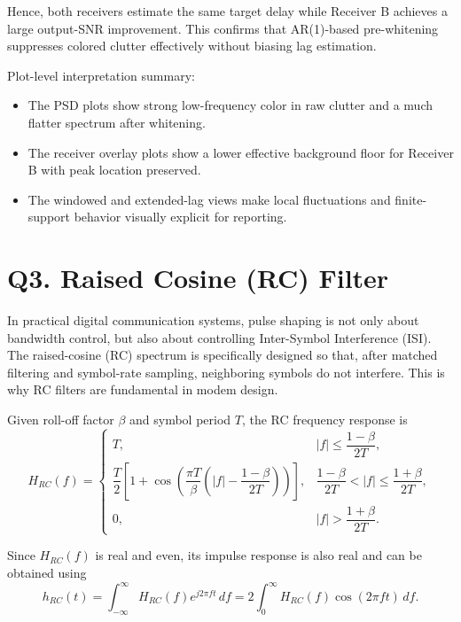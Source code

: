 \documentclass{article}
\begin{document}
Hence, both receivers estimate the same target delay while Receiver B achieves a large output-SNR improvement. This confirms that AR(1)-based pre-whitening suppresses colored clutter effectively without biasing lag estimation.

Plot-level interpretation summary:
\begin{itemize}
\item[$\rightarrow$] The PSD plots show strong low-frequency color in raw clutter and a much flatter spectrum after whitening.
\item[$\rightarrow$] The receiver overlay plots show a lower effective background floor for Receiver B with peak location preserved.
\item[$\rightarrow$] The windowed and extended-lag views make local fluctuations and finite-support behavior visually explicit for reporting.
\end{itemize}

\section{Q3. Raised Cosine (RC) Filter}

In practical digital communication systems, pulse shaping is not only about bandwidth control, but also about controlling Inter-Symbol Interference (ISI). The raised-cosine (RC) spectrum is specifically designed so that, after matched filtering and symbol-rate sampling, neighboring symbols do not interfere. This is why RC filters are fundamental in modem design.

Given roll-off factor $\beta$ and symbol period $T$, the RC frequency response is
\begin{equation*}
H_{RC}(f)=
\begin{cases}
T, & |f|\le\dfrac{1-\beta}{2T},\\[4pt]
\dfrac{T}{2}\left[1+\cos\left(\dfrac{\pi T}{\beta}\left(|f|-\dfrac{1-\beta}{2T}\right)\right)\right], & \dfrac{1-\beta}{2T}<|f|\le\dfrac{1+\beta}{2T},\\[6pt]
0, & |f|>\dfrac{1+\beta}{2T}.
\end{cases}
\end{equation*}

Since $H_{RC}(f)$ is real and even, its impulse response is also real and can be obtained using
\begin{equation*}
h_{RC}(t)=\int_{-\infty}^{\infty}H_{RC}(f)e^{j2\pi ft}\,df
=2\int_0^{\infty}H_{RC}(f)\cos(2\pi ft)\,df.
\end{equation*}
\end{document}
